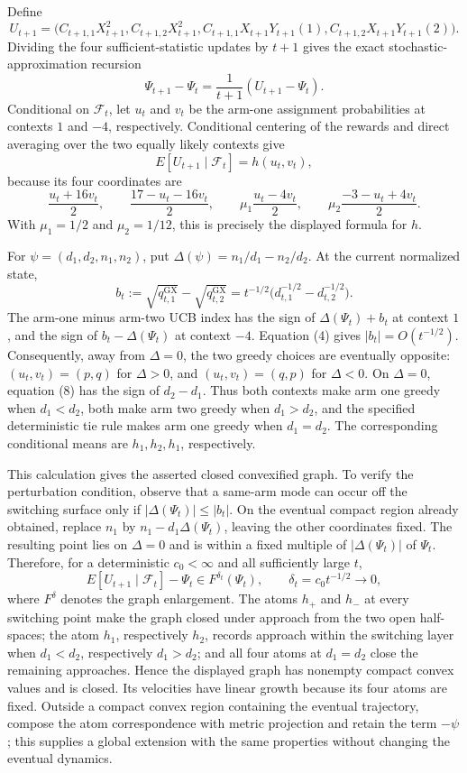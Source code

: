 Define
\[
 U_{t+1}=\bigl(C_{t+1,1}X_{t+1}^2,C_{t+1,2}X_{t+1}^2,
 C_{t+1,1}X_{t+1}Y_{t+1}(1),C_{t+1,2}X_{t+1}Y_{t+1}(2)\bigr).
\]
Dividing the four sufficient-statistic updates by \(t+1\) gives the exact stochastic-approximation recursion
\[
 \Psi_{t+1}-\Psi_t=\frac1{t+1}(U_{t+1}-\Psi_t). \tag{6}
\]
Conditional on \(\mathcal F_t\), let \(u_t\) and \(v_t\) be the arm-one assignment probabilities at contexts \(1\) and \(-4\), respectively. Conditional centering of the rewards and direct averaging over the two equally likely contexts give
\[
 E[U_{t+1}\mid\mathcal F_t]=h(u_t,v_t), \tag{7}
\]
because its four coordinates are
\[
 \frac{u_t+16v_t}{2},\qquad \frac{17-u_t-16v_t}{2},\qquad
 \mu_1\frac{u_t-4v_t}{2},\qquad
 \mu_2\frac{-3-u_t+4v_t}{2}.
\]
With \(\mu_1=1/2\) and \(\mu_2=1/12\), this is precisely the displayed formula for \(h\).

For \(\psi=(d_1,d_2,n_1,n_2)\), put \(\Delta(\psi)=n_1/d_1-n_2/d_2\). At the current normalized state,
\[
 b_t:=\sqrt{q^{\mathrm{GX}}_{t,1}}-\sqrt{q^{\mathrm{GX}}_{t,2}}
 =t^{-1/2}\bigl(d_{t,1}^{-1/2}-d_{t,2}^{-1/2}\bigr). \tag{8}
\]
The arm-one minus arm-two UCB index has the sign of \(\Delta(\Psi_t)+b_t\) at context \(1\), and the sign of \(b_t-\Delta(\Psi_t)\) at context \(-4\). Equation (4) gives \(|b_t|=O(t^{-1/2})\). Consequently, away from \(\Delta=0\), the two greedy choices are eventually opposite: \((u_t,v_t)=(p,q)\) for \(\Delta>0\), and \((u_t,v_t)=(q,p)\) for \(\Delta<0\). On \(\Delta=0\), equation (8) has the sign of \(d_2-d_1\). Thus both contexts make arm one greedy when \(d_1<d_2\), both make arm two greedy when \(d_1>d_2\), and the specified deterministic tie rule makes arm one greedy when \(d_1=d_2\). The corresponding conditional means are \(h_1,h_2,h_1\), respectively.

This calculation gives the asserted closed convexified graph. To verify the perturbation condition, observe that a same-arm mode can occur off the switching surface only if \(|\Delta(\Psi_t)|\leq |b_t|\). On the eventual compact region already obtained, replace \(n_1\) by \(n_1-d_1\Delta(\Psi_t)\), leaving the other coordinates fixed. The resulting point lies on \(\Delta=0\) and is within a fixed multiple of \(|\Delta(\Psi_t)|\) of \(\Psi_t\). Therefore, for a deterministic \(c_0<\infty\) and all sufficiently large \(t\),
\[
 E[U_{t+1}\mid\mathcal F_t]-\Psi_t\in F^{\delta_t}(\Psi_t),
 \qquad \delta_t=c_0t^{-1/2}\longrightarrow0, \tag{9}
\]
where \(F^\delta\) denotes the graph enlargement. The atoms \(h_+\) and \(h_-\) at every switching point make the graph closed under approach from the two open half-spaces; the atom \(h_1\), respectively \(h_2\), records approach within the switching layer when \(d_1<d_2\), respectively \(d_1>d_2\); and all four atoms at \(d_1=d_2\) close the remaining approaches. Hence the displayed graph has nonempty compact convex values and is closed. Its velocities have linear growth because its four atoms are fixed. Outside a compact convex region containing the eventual trajectory, compose the atom correspondence with metric projection and retain the term \(-\psi\); this supplies a global extension with the same properties without changing the eventual dynamics.

